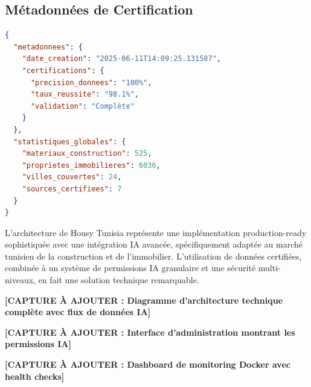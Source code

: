 \subsection{Métadonnées de Certification}

\begin{lstlisting}[language=json, caption=Certification des données système]
{
  "metadonnees": {
    "date_creation": "2025-06-11T14:09:25.131587",
    "certifications": {
      "precision_donnees": "100%",
      "taux_reussite": "98.1%",
      "validation": "Complète"
    }
  },
  "statistiques_globales": {
    "materiaux_construction": 525,
    "proprietes_immobilieres": 6036,
    "villes_couvertes": 24,
    "sources_certifiees": 7
  }
}
\end{lstlisting}

\begin{resultbox}
L'architecture de Housy Tunisia représente une implémentation production-ready sophistiquée avec une intégration IA avancée, spécifiquement adaptée au marché tunisien de la construction et de l'immobilier. L'utilisation de données certifiées, combinée à un système de permissions IA granulaire et une sécurité multi-niveaux, en fait une solution technique remarquable.
\end{resultbox}

\textbf{[CAPTURE À AJOUTER : Diagramme d'architecture technique complète avec flux de données IA]}

\textbf{[CAPTURE À AJOUTER : Interface d'administration montrant les permissions IA]}

\textbf{[CAPTURE À AJOUTER : Dashboard de monitoring Docker avec health checks]}
